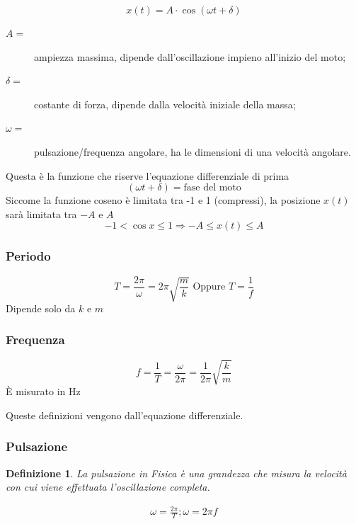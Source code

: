 \documentclass{book}
\newtheorem{defi}{Definizione}[section]
\begin{document}
\begin{equation}
  \label{eq:leggdelmotarmo}
  x(t)=A\cdot \cos(\omega t+\delta)
\end{equation}
\begin{description}
 \item[$A=$] ampiezza massima, dipende dall'oscillazione impieno all'inizio del moto;
\item[$\delta=$] costante di forza, dipende dalla velocità iniziale della massa;
\item[$\omega=$] pulsazione/frequenza angolare, ha le dimensioni di una velocità angolare.
\end{description}
Questa è la funzione che riserve l'equazione differenziale di prima
\begin{equation}
  \label{eq:leggedelmotarmo2}
  (\omega t+\delta)=\text{fase del moto}
\end{equation}
Siccome la funzione coseno è limitata tra -1 e 1 (compressi), la posizione $x(t)$ sarà limitata tra $-A$ e $A$
\begin{equation*}
  -1<\cos x \leq 1 \Longrightarrow -A\leq x(t)\leq A
\end{equation*}
\begin{multicols}{2}
  \subsubsection{Periodo}
  \label{sec:periodoarm}
  \begin{equation*}
    T=\frac{2\pi}{\omega} = 2\pi\sqrt{\frac{m}{k}} \text{ Oppure } T=\frac{1}{f}
  \end{equation*}
  Dipende solo da $k$ e $m$
  \subsubsection{Frequenza}
  \label{sec:freqarm}
  \begin{equation*}
    f=\frac{1}{T}=\frac{\omega}{2\pi}=\frac{1}{2\pi}\sqrt{\frac{k}{m}}
  \end{equation*}
  È misurato in Hz
\end{multicols}
Queste definizioni vengono dall'equazione differenziale.

\subsubsection{Pulsazione}
\label{sec:pulsazione}

\begin{defi}
  La pulsazione in Fisica è una grandezza che misura la velocità con cui viene effettuata l'oscillazione completa.
\end{defi}
\begin{eqnarray}
  \label{eq:pulsazione}
  \omega=\frac{2\pi}{T}; \omega=2\pi f
\end{eqnarray}
\end{document}
